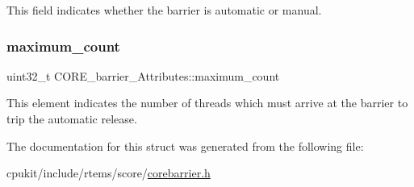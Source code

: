 This field indicates whether the barrier is automatic or manual. \mbox{\label{structCORE__barrier__Attributes_ae77aa1bd37dbf2739b92d998a3a5ebf8}} 
\subsubsection{\texorpdfstring{maximum\_count}{maximum\_count}}
{\footnotesize\ttfamily uint32\+\_\+t C\+O\+R\+E\+\_\+barrier\+\_\+\+Attributes\+::maximum\+\_\+count}

This element indicates the number of threads which must arrive at the barrier to trip the automatic release. 

The documentation for this struct was generated from the following file\+:\begin{DoxyCompactItemize}
\item 
cpukit/include/rtems/score/\mbox{\hyperlink{corebarrier_8h}{corebarrier.\+h}}\end{DoxyCompactItemize}
